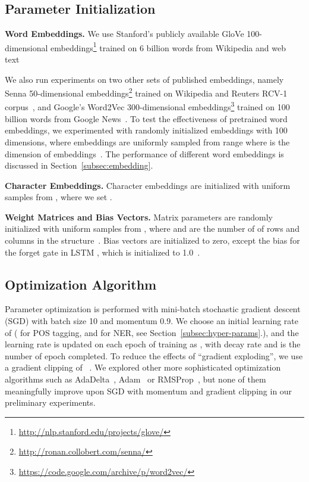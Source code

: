 \documentclass[11pt]{article}
\begin{document}
\subsection{Parameter Initialization}
\label{subsec:init}
\textbf{Word Embeddings.} We use Stanford's publicly available GloVe 100-dimensional embeddings\footnote{\url{http://nlp.stanford.edu/projects/glove/}} trained on 6 billion words from Wikipedia and web text~\cite{pennington:EMNLP2014}

We also run experiments on two other sets of published embeddings, namely Senna 50-dimensional embeddings\footnote{\url{http://ronan.collobert.com/senna/}} trained on Wikipedia and Reuters RCV-1 corpus~\cite{collobert2011natural}, and Google's Word2Vec 300-dimensional embeddings\footnote{\url{https://code.google.com/archive/p/word2vec/}} trained on 100 billion words from Google News~\cite{mikolov2013}. To test the effectiveness of pretrained word embeddings, we experimented with randomly initialized embeddings with 100 dimensions, where embeddings are uniformly sampled from range  where  is the dimension of embeddings~\cite{he2015delving}. The performance of different word embeddings is discussed in Section~\ref{subsec:embedding}.

\noindent
\textbf{Character Embeddings.} Character embeddings are initialized with uniform samples from , where we set .

\noindent
\textbf{Weight Matrices and Bias Vectors.} Matrix parameters are randomly initialized with uniform samples from , where  and  are the number of of rows and columns in the structure~\cite{glorot2010}. Bias vectors are initialized to zero, except the bias  for the forget gate in LSTM , which is initialized to 1.0~\cite{jozefowicz2015}.

\subsection{Optimization Algorithm}
Parameter optimization is performed with mini-batch stochastic gradient descent (SGD) with batch size 10 and momentum 0.9.
We choose an initial learning rate of  ( for POS tagging, and  for NER, see Section~\ref{subsec:hyper-params}.), and the learning rate is updated on each epoch of training as , with decay rate  and  is the number of epoch completed. To reduce the effects of ``gradient exploding'', we use a gradient clipping of ~\cite{pascanu2012}. We explored other more sophisticated optimization algorithms such as AdaDelta~\cite{zeiler2012adadelta}, Adam~\cite{kingma2014adam} or RMSProp~\cite{dauphin2015rmsprop}, but none of them meaningfully improve upon SGD with momentum and gradient clipping in our preliminary experiments.
\end{document}
